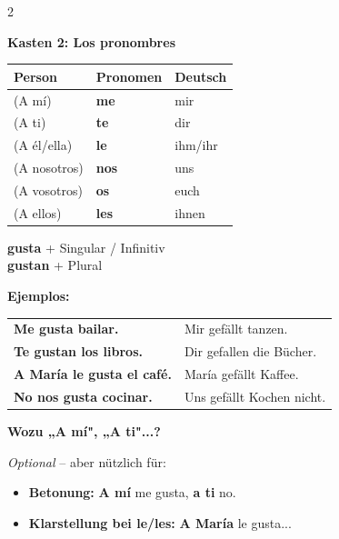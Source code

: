 \documentclass[10pt, a4paper]{article}
\newcommand{\fachfarbe}{spanisch}
\newcommand{\es}[1]{\textcolor{\fachfarbe}{\textbf{#1}}}
\newcommand{\abschnitt}[1]{%
    \vspace{8pt}
    \noindent\textbf{\textcolor{\fachfarbe}{#1}}
    \vspace{4pt}
}
\begin{document}
\begin{multicols}{2}
\vspace{6pt}


\abschnitt{Kasten 2: Los pronombres}

\begin{tabular}{|l|l|l|}
\hline
\textbf{Person} & \textbf{Pronomen} & \textbf{Deutsch} \\
\hline
(A mí) & \es{me} & mir \\
\hline
(A ti) & \es{te} & dir \\
\hline
(A él/ella) & \es{le} & ihm/ihr \\
\hline
(A nosotros) & \es{nos} & uns \\
\hline
(A vosotros) & \es{os} & euch \\
\hline
(A ellos) & \es{les} & ihnen \\
\hline
\end{tabular}

\vspace{6pt}

\begin{merksatz}
\es{gusta} + Singular / Infinitiv\\
\es{gustan} + Plural
\end{merksatz}

\vspace{6pt}

{\small\textbf{Ejemplos:}}

{\small
\begin{tabular}{@{}l@{ }l@{}}
\es{Me gusta bailar.} & Mir gefällt tanzen. \\
\es{Te gustan los libros.} & Dir gefallen die Bücher. \\
\es{A María le gusta el café.} & María gefällt Kaffee. \\
\es{No nos gusta cocinar.} & Uns gefällt Kochen nicht. \\
\end{tabular}}

\vspace{4pt}

{\footnotesize\textbf{Wozu „A mí", „A ti"...?}

\textit{Optional} -- aber nützlich für:
\begin{itemize}[nosep, leftmargin=1em]
\item \textbf{Betonung:} \es{A mí} me gusta, \es{a ti} no.
\item \textbf{Klarstellung bei le/les:} \es{A María} le gusta...
\end{itemize}}


\end{multicols}
\end{document}
